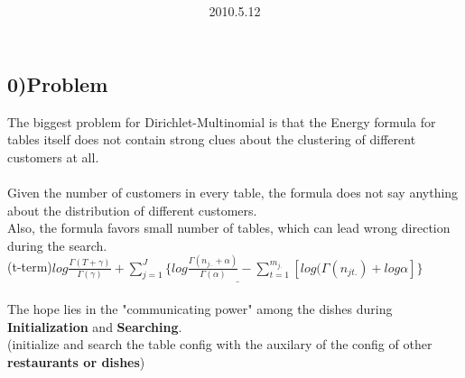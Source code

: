 \documentclass{article}
\title{\vspace{0.3in}\textmd{\textbf{\hmwkTitle}}}
\date{2010.5.12}
\author{\textbf{\hmwkAuthorName}}
\begin{document}
\begin{spacing}{1.1}
\maketitle

\section{0)Problem}
The biggest problem for Dirichlet-Multinomial is that the Energy formula for tables itself does not contain strong clues about the clustering of 
different customers at all. \\ \\
Given the number of customers in every table, the formula does not say anything about the distribution of different customers.\\
Also, the formula favors small number of tables, which can lead wrong direction during the search.\\
(t-term)$ \underline{log \frac{\Gamma(T+\gamma)}{\Gamma(\gamma)}+\sum_{j=1}^{J} \{log \frac{\Gamma(n_{j..}+\alpha)}{\Gamma(\alpha)}-\sum_{t=1}^{m_{j.}}[log(\Gamma(n_{jt.})+log \alpha
]\}}$\\ \\
The hope lies in the "communicating power" among the dishes during {\bf Initialization} and {\bf Searching}.\\
(initialize and search the table config with the auxilary of the config of other {\bf restaurants or dishes})\\ 

\end{spacing}
\end{document}

